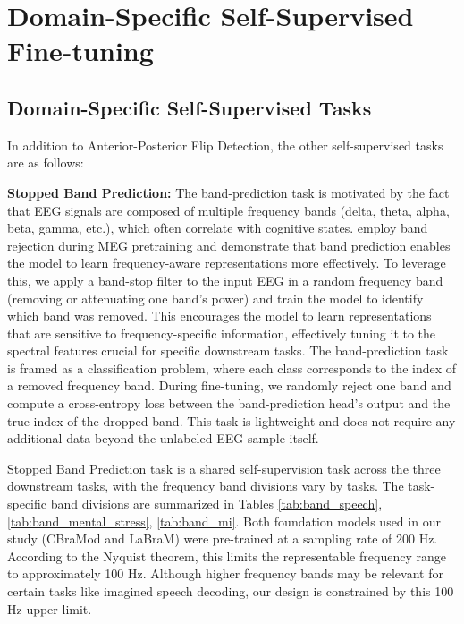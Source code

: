 

\vfill\pagebreak


\section{Domain-Specific Self-Supervised Fine-tuning}




\subsection{Domain-Specific Self-Supervised Tasks}
\label{sec:Appendix_ssl_tasks}
In addition to Anterior-Posterior Flip Detection, the other self-supervised tasks are as follows:

\textbf{Stopped Band Prediction: }The band-prediction task is motivated by the fact that EEG signals are composed of multiple frequency bands (delta, theta, alpha, beta, gamma, etc.), which often correlate with cognitive states. \cite{jayalath2024brain} employ band rejection during MEG pretraining and demonstrate that band prediction enables the model to learn frequency-aware representations more effectively. To leverage this, we apply a band-stop filter to the input EEG in a random frequency band (removing or attenuating one band’s power) and train the model to identify which band was removed. This encourages the model to learn representations that are sensitive to frequency-specific information, effectively tuning it to the spectral features crucial for specific downstream tasks. The band-prediction task is framed as a classification problem, where each class corresponds to the index of a removed frequency band. During fine-tuning, we randomly reject one band and compute a cross-entropy loss between the band-prediction head’s output and the true index of the dropped band. This task is lightweight and does not require any additional data beyond the unlabeled EEG sample itself.



Stopped Band Prediction task is a shared self-supervision task across the three downstream tasks, with the frequency band divisions vary by tasks. The task-specific band divisions are summarized in Tables \ref{tab:band_speech}, \ref{tab:band_mental_stress}, \ref{tab:band_mi}. Both foundation models used in our study (CBraMod and LaBraM) were pre-trained at a sampling rate of 200 Hz. According to the Nyquist theorem, this limits the representable frequency range to approximately 100 Hz. Although higher frequency bands may be relevant for certain tasks like imagined speech decoding, our design is constrained by this 100 Hz upper limit.

